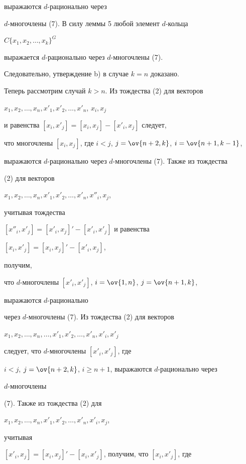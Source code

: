 выражаются $d$-рационально через 


$d$-многочлены (7). В силу леммы 5 любой элемент $d$-кольца 


$C\{x_1,x_2,\dotsc,x_k\}^G$


выражается $d$-рационально через $d$-многочлены (7).





Следовательно, утверждение b) в случае $k=n$ доказано. 





Теперь рассмотрим случай $k>n$. Из тождества (2) для векторов


$x_1,x_2,\dotsc,x_n,x'_1,x'_2,\dotsc,x'_n$, $x_i,x_j$




и равенства $[x_i, x'_j]=[x_i, x_j]-[x'_i, x_j]$ следует,


что многочлены $[x_i,x_j]$, где $i<j$, $j=\ov{n+2,k}$, $i=\ov{n+1,k-1}$,


выражаются $d$-рационально через $d$-многочлены (7). Также из тождества 


(2) для векторов


$x_1,x_2,\dotsc,x_n,x'_1,x'_2,\dotsc,x'_n,x''_i,x_j$,


учитывая тождества 


$[x''_i, x'_j]=[x'_i, x_j]'-[x'_i, x'_j]$ и равенства


$[x_i, x'_j]=[x_i, x_j]'-[x'_i, x_j]$,


получим,


что $d$-многочлены $[x'_i, x'_j]$, $i=\ov{1,n}$, $j=\ov{n+1,k}$,


выражаются $d$-рационально 


через $d$-многочлены (7). Из тождества (2) для векторов 


$x_1,x_2,\dotsc,x_n,\dotsc,x'_1,x'_2,\dotsc,x'_n,x'_i,x'_j$


следует, что $d$-многочлены $[x'_i, x'_j]$, где


$i<j$, $j=\ov{n+2,k}$, $i\ge n+1$, выражаются $d$-рационально через 


$d$-многочлены


(7). Также из тождества (2) для


$x_1,x_2,\dotsc,x_n,x'_1,x'_2,\dotsc,x'_n,x'_i,x_j$,


учитывая


$[x'_i, x_j]=[x_i, x_j]'-[x_i, x'_j]$, получим, что $[x_i, x'_j]$, где


